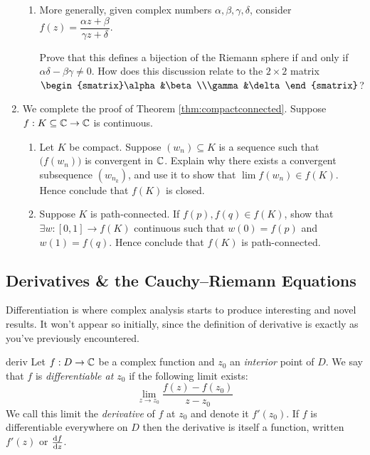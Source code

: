 \begin{exercises}{}{}
\begin{enumerate}
\begin{enumerate}
	  	\item More generally, given complex numbers $\alpha,\beta,\gamma,\delta$, consider $f(z)=\dfrac{\alpha z+\beta}{\gamma z+\delta}$.\par
	  	Prove that this defines a bijection of the Riemann sphere if and only if $\alpha\delta-\beta\gamma\neq 0$. How does this discussion relate to the $2\times 2$ matrix $\begin{smatrix}\alpha&\beta\\\gamma&\delta\end{smatrix}$?
	  \end{enumerate}
	  
	  
	  \item We complete the proof of Theorem \ref{thm:compactconnected}. Suppose $f:K\subseteq\C\to\C$ is continuous.
	  \begin{enumerate}
	    \item Let $K$ be compact. Suppose $(w_n)\subseteq K$ is a sequence such that $\bigl(f(w_n)\bigr)$ is convergent in $\C$. Explain why there exists a convergent subsequence $(w_{n_k})$, and use it to show that $\lim f(w_n)\in f(K)$. Hence conclude that $f(K)$ is closed.
	    
			\item Suppose $K$ is path-connected. If $f(p),f(q)\in f(K)$, show that $\exists w:[0,1]\to f(K)$ continuous such that $w(0)=f(p)$ and $w(1)=f(q)$. Hence conclude that $f(K)$ is path-connected.
	  \end{enumerate}
	\end{enumerate}
\end{exercises}

\clearpage



\subsection[Derivatives \& Cauchy--Riemann]{Derivatives \& the Cauchy--Riemann Equations}%

Differentiation is where complex analysis starts to produce interesting and novel results. It won't appear so initially, since the definition of derivative is exactly as you've previously encountered.

\begin{defn}{}{deriv}
	Let $f:D\to\C$ be a complex function and $z_0$ an \emph{interior} point of $D$. We say that $f$ is \emph{differentiable at $z_0$} if the following limit exists:
	\[
		\lim_{z\to z_0}\frac{f(z)-f(z_0)}{z-z_0}
	\]
	We call this limit the \emph{derivative} of $f$ at $z_0$ and denote it $f'(z_0)$. If $f$ is differentiable everywhere\footnotemark{} on $D$ then the derivative is itself a function, written $f'(z)$ or $\diff[f]{z}$. 
\end{defn}

